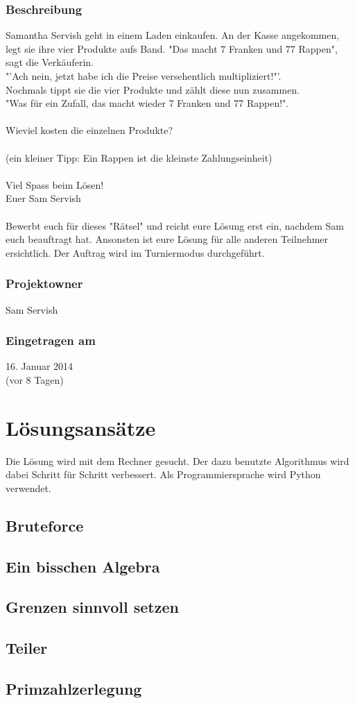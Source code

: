\documentclass[10pt, fleqn]{article}
\begin{document}
\subsubsection*{Beschreibung}
Samantha Servish geht in einem Laden einkaufen. An der Kasse angekommen, legt 
sie ihre vier Produkte aufs Band. "Das macht 7 Franken und 77 Rappen", sagt 
die Verkäuferin. \\
"'Ach nein, jetzt habe ich die Preise versehentlich multipliziert!"'. \\
Nochmals tippt sie die vier Produkte und zählt diese nun zusammen. \\
"Was für ein Zufall, das macht wieder 7 Franken und 77 Rappen!". \\\\
%
Wieviel kosten die einzelnen Produkte? \\\\
%
(ein kleiner Tipp: Ein Rappen ist die kleinste Zahlungseinheit) \\\\
%
Viel Spass beim Lösen! \\
Euer Sam Servish \\\\
%
Bewerbt euch für dieses "Rätsel" und reicht eure Lösung erst ein, nachdem Sam 
euch beauftragt hat. Ansonsten ist eure Lösung für alle anderen Teilnehmer 
ersichtlich. Der Auftrag wird im Turniermodus durchgeführt. 

\subsubsection*{Projektowner}
Sam Servish 

\subsubsection*{Eingetragen am}
16. Januar 2014 \\
(vor 8 Tagen) 

\newpage

\section{Lösungsansätze}
Die Lösung wird mit dem Rechner gesucht. Der dazu benutzte Algorithmus wird 
dabei Schritt für Schritt verbessert. Als Programmiersprache wird Python 
verwendet. 

\subsection{Bruteforce}

\subsection{Ein bisschen Algebra}

\subsection{Grenzen sinnvoll setzen}

\subsection{Teiler}

\subsection{Primzahlzerlegung}
\end{document}
